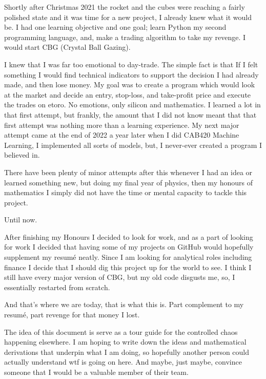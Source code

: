 Shortly after Christmas 2021 the rocket and the cubes were reaching a fairly polished state and it was time for a new project, I already knew what it would be. I had one learning objective and one goal; learn Python my second programming language, and, make a trading algorithm to take my revenge. I would start CBG (Crystal Ball Gazing).

I knew that I was far too emotional to day-trade. The simple fact is that If I felt something I would find technical indicators to support the decision I had already made, and then lose money. My goal was to create a program which would look at the market and decide an entry, stop-loss, and take-profit price and execute the trades on etoro. No emotions, only silicon and mathematics. I learned a lot in that first attempt, but frankly, the amount that I did not know meant that that first attempt was nothing more than a learning experience. My next major attempt came at the end of 2022 a year later when I did CAB420 Machine Learning, I implemented all sorts of models, but, I never-ever created a program I believed in.

There have been plenty of minor attempts after this whenever I had an idea or learned something new, but doing my final year of physics, then my honours of mathematics I simply did not have the time or mental capacity to tackle this project. 

Until now.

After finishing my Honours I decided to look for work, and as a part of looking for work I decided that having some of my projects on GitHub would hopefully supplement my resum\'e neatly. Since I am looking for analytical roles including finance I decide that I should dig this project up for the world to see. I think I still have every major version of CBG, but my old code disgusts me, so, I essentially restarted from scratch.

And that's where we are today, that is what this is. Part complement to my resum\'e, part revenge for that money I lost.

The idea of this document is serve as a tour guide for the controlled chaos happening elsewhere. I am hoping to write down the ideas and mathematical derivations that underpin what I am doing, so hopefully another person could actually understand wtf is going on here. And maybe, just maybe, convince someone that I would be a valuable member of their team.

\tableofcontents